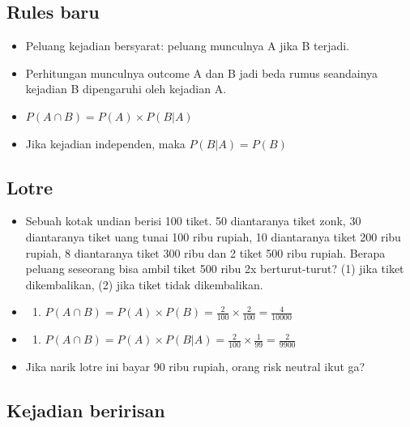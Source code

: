 \documentclass[
  letterpaper,
  DIV=11,
  numbers=noendperiod]{scrartcl}
\providecommand{\tightlist}{%
  \setlength{\itemsep}{0pt}\setlength{\parskip}{0pt}}\usepackage{longtable,booktabs,array}
\begin{document}
\hypertarget{rules-baru-1}{%
\subsection{Rules baru}\label{rules-baru-1}}

\begin{itemize}
\item
  Peluang kejadian bersyarat: peluang munculnya A jika B terjadi.
\item
  Perhitungan munculnya outcome A dan B jadi beda rumus seandainya
  kejadian B dipengaruhi oleh kejadian A.
\item
  \(P(A \cap B)=P(A) \times P(B|A)\)
\item
  Jika kejadian independen, maka \(P(B|A)= P(B)\)
\end{itemize}

\hypertarget{lotre}{%
\subsection{Lotre}\label{lotre}}

\begin{itemize}
\item
  Sebuah kotak undian berisi 100 tiket. 50 diantaranya tiket zonk, 30
  diantaranya tiket uang tunai 100 ribu rupiah, 10 diantaranya tiket 200
  ribu rupiah, 8 diantaranya tiket 300 ribu dan 2 tiket 500 ribu rupiah.
  Berapa peluang seseorang bisa ambil tiket 500 ribu 2x berturut-turut?
  (1) jika tiket dikembalikan, (2) jika tiket tidak dikembalikan.
\item
  \begin{enumerate}
  \def\labelenumi{(\arabic{enumi})}
  \tightlist
  \item
    \(P(A \cap B)=P(A) \times P(B)= \frac{2}{100} \times \frac{2}{100} = \frac{4}{10000}\)
  \end{enumerate}
\item
  \begin{enumerate}
  \def\labelenumi{(\arabic{enumi})}
  \setcounter{enumi}{1}
  \tightlist
  \item
    \(P(A \cap B)=P(A) \times P(B|A)= \frac{2}{100} \times \frac{1}{99} = \frac{2}{9900}\)
  \end{enumerate}
\item
  Jika narik lotre ini bayar 90 ribu rupiah, orang risk neutral ikut ga?
\end{itemize}

\hypertarget{kejadian-beririsan}{%
\subsection{Kejadian beririsan}\label{kejadian-beririsan}}
\end{document}
